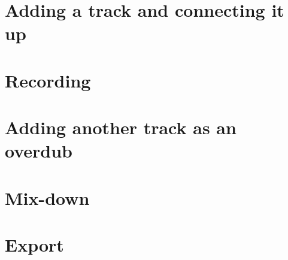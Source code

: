 \documentclass{book}
\begin{document}
\section{Adding a track and connecting it up}

\section{Recording}

\section{Adding another track as an overdub}

\section{Mix-down}

\section{Export}
\end{document}
